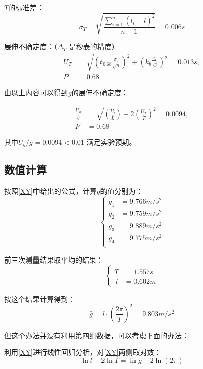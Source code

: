 \documentclass[a4paper]{ltxdoc}
\begin{document}
\begin{multicols}{2}
\begin{itemize}
          $T$的标准差：
          $$
            \sigma_T = \sqrt{\frac {\sum _{i=1}^{n} (l_i- \bar l)^2} {n-1}} = 0.006 s
          $$

          展伸不确定度：（$\Delta_T$ 是秒表的精度）
          $$
            \begin{aligned}
              U_T & = \sqrt{(t_{0.68} \frac {\sigma _T} {\sqrt{n}})^2 + (k_b \frac {\Delta_T} {C})^2} = 0.013 s, \\
              P   & =0.68
            \end{aligned}
          $$

          由以上内容可以得到$g$的展伸不确定度：

          $$
            \begin{aligned}
              \frac {U_g}{\bar g} & = \sqrt {(\frac {U_l} {\bar L}) + 2(\frac{U_T}{\bar T})^2} = 0.0094, \\
              P                   & =0.68
            \end{aligned}
          $$

          其中$U_g/\bar g=0.0094 < 0.01$ 满足实验预期。
  \end{itemize}
  \subsection{数值计算}
  按照\eqref{XY}中给出的公式，计算$g$的值分别为：
  $$
    \left\{
    \begin{aligned}
      g_1 & =9.766 m/s^2 \\
      g_2 & =9.759 m/s^2 \\
      g_3 & =9.889 m/s^2 \\
      g_4 & =9.775 m/s^2 \\
    \end{aligned}
    \right.
  $$

  前三次测量结果取平均的结果：
  $$
    \left\{
    \begin{aligned}
      \bar T   & = 1.557 s \\
      \ \bar l & = 0.602 m
    \end{aligned}
    \right.
  $$

  按这个结果计算得到：
  $$\bar g=\bar l\cdot (\frac {2\pi} {\bar T})^2=9.803m/s^2$$

  但这个办法并没有利用第四组数据，可以考虑下面的办法：

  利用\eqref{XY}进行线性回归分析，对\eqref{XY}两侧取对数：
  \begin{equation}
    \ln l - 2\ln T = \ln g - 2\ln(2\pi)
  \end{equation}


\end{multicols}
\end{document}
